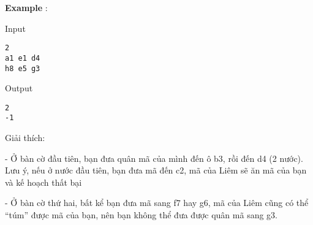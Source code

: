 \textbf{    Example   }   :  

Input
\begin{verbatim}
2
a1 e1 d4
h8 e5 g3
\end{verbatim}

Output
\begin{verbatim}
2
-1
\end{verbatim}



   Giải thích:  

   - Ở bàn cờ đầu tiên, bạn đưa quân mã của mình đến ô b3, rồi đến d4 (2 nước). Lưu ý, nếu ở nước đầu tiên, bạn đưa mã đến c2, mã của Liêm sẽ ăn mã của bạn và kế hoạch thất bại  

   - Ở bàn cờ thứ hai, bất kể bạn đưa mã sang f7 hay g6, mã của Liêm cũng có thể “túm” được mã của bạn, nên bạn không thể đưa được quân mã sang g3.  
